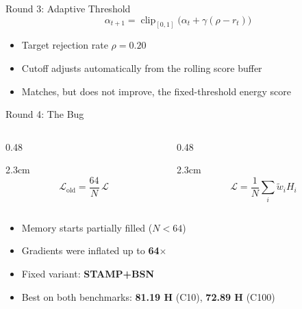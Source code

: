 \documentclass[aspectratio=169,10pt]{beamer}
\begin{document}
\begin{frame}{Round 3: Adaptive Threshold}
  \[
    \alpha_{t+1} = \operatorname{clip}_{[0,1]}\big(\alpha_t + \gamma(\rho - r_t)\big)
  \]
  \begin{itemize}
    \setlength\itemsep{2.5mm}
    \item Target rejection rate $\rho = 0.20$
    \item Cutoff adjusts automatically from the rolling score buffer
  \end{itemize}
  \vspace{5mm}
  \vspace{2mm}
  \begin{itemize}
    \item Matches, but does not improve, the fixed-threshold energy score
  \end{itemize}
\end{frame}

\begin{frame}{Round 4: The Bug}
  \begin{columns}[T]
    \begin{column}{0.48\textwidth}
      \begin{cardh}{2.3cm}
      \\[2mm]
      \[
        \mathcal{L}_{\mathrm{old}} = \frac{64}{N}\,\mathcal{L}
      \]
      \end{cardh}
    \end{column}
    \begin{column}{0.48\textwidth}
      \begin{cardh}{2.3cm}
      \\[2mm]
      \[
        \mathcal{L} = \frac{1}{N}\sum_i \widetilde{w}_i H_i
      \]
      \end{cardh}
    \end{column}
  \end{columns}
  \vspace{5mm}
  \begin{itemize}
    \setlength\itemsep{2.5mm}
    \item Memory starts partially filled ($N{<}64$)
    \item Gradients were inflated up to \textbf{64$\times$}
    \item Fixed variant: \textbf{STAMP+BSN}
  \end{itemize}
  \vspace{3mm}
  \vspace{2mm}
  \begin{itemize}
    \item Best on both benchmarks: \textbf{\color{Steel}81.19 H} (C10), \textbf{\color{Steel}72.89 H} (C100)
  \end{itemize}
\end{frame}
\end{document}
